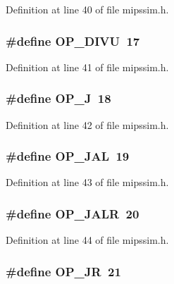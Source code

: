 Definition at line 40 of file mipssim.\+h.

\subsubsection[{O\+P\+\_\+\+D\+I\+VU}]{\setlength{\rightskip}{0pt plus 5cm}\#define O\+P\+\_\+\+D\+I\+VU~17}\label{mipssim_8h_a71db8f041e34362c0341beab3508fafe}


Definition at line 41 of file mipssim.\+h.

\subsubsection[{O\+P\+\_\+J}]{\setlength{\rightskip}{0pt plus 5cm}\#define O\+P\+\_\+J~18}\label{mipssim_8h_ad7083aaada2e28a9efd41b7cdb093d49}


Definition at line 42 of file mipssim.\+h.

\subsubsection[{O\+P\+\_\+\+J\+AL}]{\setlength{\rightskip}{0pt plus 5cm}\#define O\+P\+\_\+\+J\+AL~19}\label{mipssim_8h_ab1f2474b51bf5d727559f3ce9a47480c}


Definition at line 43 of file mipssim.\+h.

\subsubsection[{O\+P\+\_\+\+J\+A\+LR}]{\setlength{\rightskip}{0pt plus 5cm}\#define O\+P\+\_\+\+J\+A\+LR~20}\label{mipssim_8h_ac3a204cab31fee6f9a12aa5642897d0b}


Definition at line 44 of file mipssim.\+h.

\subsubsection[{O\+P\+\_\+\+JR}]{\setlength{\rightskip}{0pt plus 5cm}\#define O\+P\+\_\+\+JR~21}\label{mipssim_8h_ab06ef872de3d15ec7c9c63d8a4726fe9}


